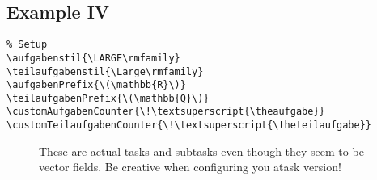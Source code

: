 \documentclass{ctext}
\newenvironment{example}{\begin{figure}[H]\centering\begin{minipage}{.95\textwidth}}{\end{minipage}\end{figure}\vfill\pagebreak}
\begin{document}
\subsection{Example IV}
\begin{verbatim}
% Setup
\aufgabenstil{\LARGE\rmfamily}
\teilaufgabenstil{\Large\rmfamily}
\aufgabenPrefix{\(\mathbb{R}\)}
\teilaufgabenPrefix{\(\mathbb{Q}\)}
\customAufgabenCounter{\!\textsuperscript{\theaufgabe}}
\customTeilaufgabenCounter{\!\textsuperscript{\theteilaufgabe}}
\end{verbatim}
\aufgabenstil{\LARGE\rmfamily}
\teilaufgabenstil{\Large\rmfamily}
\customAufgabenCounter{\!\textsuperscript{\theaufgabe}}
\customTeilaufgabenCounter{\!\textsuperscript{\theteilaufgabe}}

\begin{example}
  \aufgabe{}
  \teilaufgabe{}
  \teilaufgabe{}
  \teilaufgabe{}
  \aufgabe{}
  These are actual tasks and subtasks even though they seem to be vector fields. Be creative when configuring you atask version!
\end{example}

\ResetAll
\end{document}
